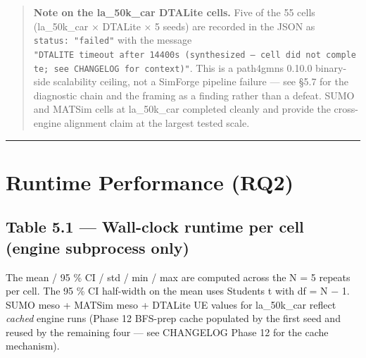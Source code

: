 \begin{quote}
\textbf{Note on the la\_50k\_car DTALite cells.} Five of the 55 cells
(la\_50k\_car × DTALite × 5 seeds) are recorded in the JSON as
\texttt{status:\ "failed"} with the message
\texttt{"DTALITE\ timeout\ after\ 14400s\ (synthesized\ —\ cell\ did\ not\ complete;\ see\ CHANGELOG\ for\ context)"}.
This is a path4gmns 0.10.0 binary-side scalability ceiling, not a
SimForge pipeline failure --- see §5.7 for the diagnostic chain and the
framing as a finding rather than a defeat. SUMO and MATSim cells at
la\_50k\_car completed cleanly and provide the cross-engine alignment
claim at the largest tested scale.
\end{quote}

\begin{center}\rule{0.5\linewidth}{0.5pt}\end{center}

\section{Runtime Performance
(RQ2)}\label{51-runtime-performance-rq2}

\subsection{Table 5.1 --- Wall-clock runtime per cell (engine subprocess
only)}\label{table-51--wall-clock-runtime-per-cell-engine-subprocess-only}

The mean / 95 \% CI / std / min / max are computed across the N = 5
repeats per cell. The 95 \% CI half-width on the mean uses
Student\textquotesingle s t with df = N − 1. SUMO meso + MATSim meso +
DTALite UE values for la\_50k\_car reflect \emph{cached} engine runs
(Phase 12 BFS-prep cache populated by the first seed and reused by the
remaining four --- see CHANGELOG Phase 12 for the cache mechanism).

